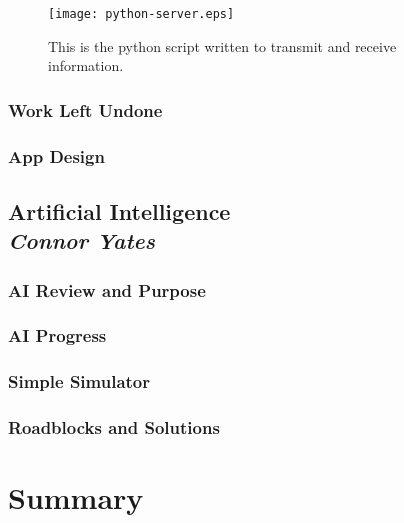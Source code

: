 \documentclass[draftclsnofoot,onecolumn,letterpaper,10pt]{IEEEtran}
\begin{document}
\begin{figure}
\label{fig:python}
\caption{This is the python script written to transmit and receive information.}
\texttt{[image: python-server.eps]}
\end{figure}

\vfill
\clearpage
\subsubsection{Work Left Undone}

\subsubsection{App Design}


\subsection{Artificial Intelligence\\{\em\textbf{Connor Yates}}}
\subsubsection{AI Review and Purpose}


\subsubsection{AI Progress}

\subsubsection{Simple Simulator}

\subsubsection{Roadblocks and Solutions}


\section{Summary}
\end{document}
